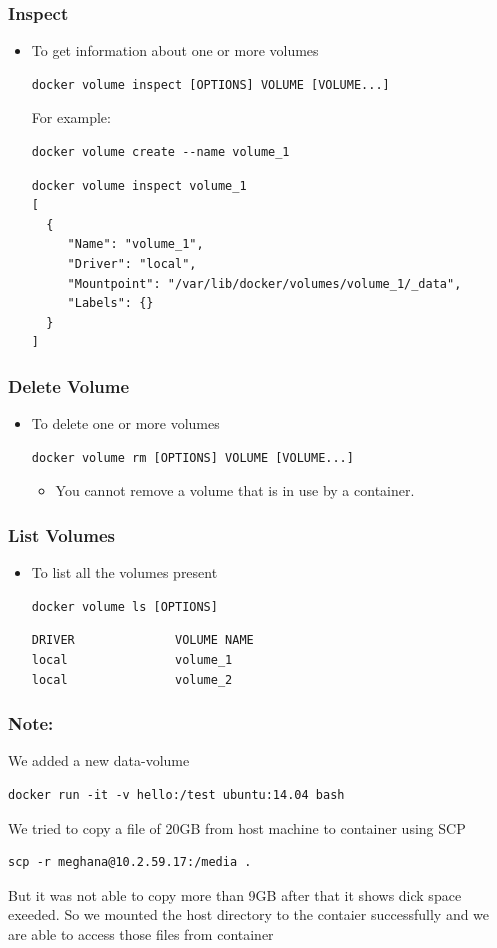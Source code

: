 \documentclass[11pt]{article}
\begin{document}
\subsubsection{Inspect}
\label{sec:orgheadline29}
\begin{itemize}
\item To get information about one or more volumes
\begin{verbatim}
docker volume inspect [OPTIONS] VOLUME [VOLUME...]
\end{verbatim}
For example:
\begin{verbatim}
docker volume create --name volume_1
\end{verbatim}
\begin{verbatim}
docker volume inspect volume_1
[
  {
     "Name": "volume_1",
     "Driver": "local",
     "Mountpoint": "/var/lib/docker/volumes/volume_1/_data",
     "Labels": {}
  }
]
\end{verbatim}
\end{itemize}
\subsubsection{Delete Volume}
\label{sec:orgheadline30}
\begin{itemize}
\item To delete one or more volumes
\begin{verbatim}
docker volume rm [OPTIONS] VOLUME [VOLUME...]
\end{verbatim}
\begin{itemize}
\item You cannot remove a volume that is in use by a container.
\end{itemize}
\end{itemize}
\subsubsection{List Volumes}
\label{sec:orgheadline31}
\begin{itemize}
\item To list all the volumes present
\begin{verbatim}
docker volume ls [OPTIONS]
\end{verbatim}
\begin{verbatim}
DRIVER              VOLUME NAME
local               volume_1
local               volume_2
\end{verbatim}
\end{itemize}
\subsubsection{Note:}
\label{sec:orgheadline32}
We added a new data-volume
\begin{verbatim}
docker run -it -v hello:/test ubuntu:14.04 bash
\end{verbatim}
We tried to copy a file of 20GB from host machine to container using SCP
\begin{verbatim}
scp -r meghana@10.2.59.17:/media .
\end{verbatim}
But it was not able to copy more than 9GB after that it shows dick space
exeeded.
So we mounted the host directory to the contaier successfully and we are
able to access those files from container
\end{document}
